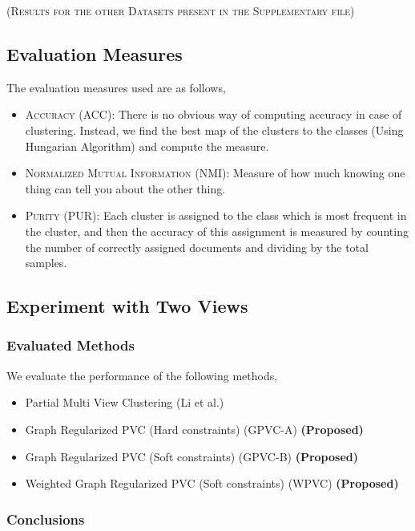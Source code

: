 \documentclass[a4paper]{article}
\begin{document}
	\null \hfill {\footnotesize{\textsc{(Results for the other Datasets present in the Supplementary file)}}}\\
	
	\subsection{Evaluation Measures}

	The evaluation measures used are as follows,
	\begin{itemize}
	\item \textsc{Accuracy (ACC):} There is no obvious way of computing accuracy in case of clustering. Instead, we find the best map of the clusters to the classes (Using Hungarian Algorithm) and compute the measure.
	\item \textsc{Normalized Mutual Information (NMI):} Measure of how much knowing one thing can tell you about the other thing.
	\item \textsc{Purity (PUR):} Each cluster is assigned to the class which is most frequent in the cluster, and then the accuracy of this assignment is measured by counting the number of correctly assigned documents and dividing by the total samples.
	\end{itemize}

	\subsection{Experiment with Two Views}	

	\subsubsection{Evaluated Methods}
		
	We evaluate the performance of the following methods,
	\begin{itemize}
	\item {Partial Multi View Clustering (Li et al.) ~\cite{pvc15}}
	\item {Graph Regularized PVC (Hard constraints) (GPVC-A)	\small\textbf{(Proposed)}}
	\item {Graph Regularized PVC (Soft constraints) (GPVC-B)	\small\textbf{(Proposed)}}
	\item {Weighted Graph Regularized PVC (Soft constraints) (WPVC)	\small\textbf{(Proposed)}}
	\end{itemize}	

	\subsubsection{Conclusions}
\end{document}
